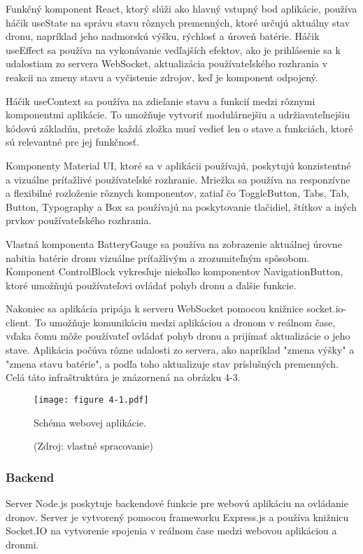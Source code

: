 Funkčný komponent React, ktorý slúži ako hlavný vstupný bod aplikácie, používa háčik useState na správu stavu rôznych premenných, ktoré určujú aktuálny stav dronu, napríklad jeho nadmorskú výšku, rýchlosť a úroveň batérie. Háčik useEffect sa používa na vykonávanie vedľajších efektov, ako je prihlásenie sa k udalostiam zo servera WebSocket, aktualizácia používateľského rozhrania v reakcii na zmeny stavu a vyčistenie zdrojov, keď je komponent odpojený.

Háčik useContext sa používa na zdieľanie stavu a funkcií medzi rôznymi komponentmi aplikácie. To umožňuje vytvoriť modulárnejšiu a udržiavateľnejšiu kódovú základňu, pretože každá zložka musí vedieť len o stave a funkciách, ktoré sú relevantné pre jej funkčnosť.

Komponenty Material UI, ktoré sa v aplikácii používajú, poskytujú konzistentné a vizuálne príťažlivé používateľské rozhranie. Mriežka sa používa na responzívne a flexibilné rozloženie rôznych komponentov, zatiaľ čo ToggleButton, Tabs, Tab, Button, Typography a Box sa používajú na poskytovanie tlačidiel, štítkov a iných prvkov používateľského rozhrania.

Vlastná komponenta BatteryGauge sa používa na zobrazenie aktuálnej úrovne nabitia batérie dronu vizuálne príťažlivým a zrozumiteľným spôsobom. Komponent ControlBlock vykresľuje niekoľko komponentov NavigationButton, ktoré umožňujú používateľovi ovládať pohyb dronu a ďalšie funkcie.

Nakoniec sa aplikácia pripája k serveru WebSocket pomocou knižnice socket.io-client. To umožňuje komunikáciu medzi aplikáciou a dronom v reálnom čase, vďaka čomu môže používateľ ovládať pohyb dronu a prijímať aktualizácie o jeho stave. Aplikácia počúva rôzne udalosti zo servera, ako napríklad "zmena výšky" a "zmena stavu batérie", a podľa toho aktualizuje stav príslušných premenných. Celá táto infraštruktúra je znázornená na obrázku 4-3.

\begin{figure}[ht!]
    \centering
    \texttt{[image: figure 4-1.pdf]}
    \caption{Schéma webovej aplikácie.}
    \captionsetup{font=footnotesize, justification=centering, skip=5pt}
    \caption*{(Zdroj: vlastné spracovanie)}
    \label{o:4-1}
\end{figure}  

\subsubsection{Backend}
Server Node.js poskytuje backendové funkcie pre webovú aplikáciu na ovládanie dronov. Server je vytvorený pomocou frameworku Express.js a používa knižnicu Socket.IO na vytvorenie spojenia v reálnom čase medzi webovou aplikáciou a dronmi.


